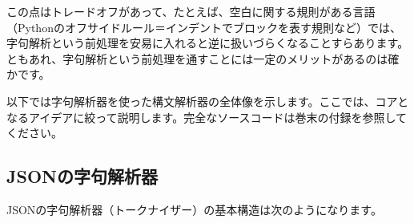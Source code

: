 この点はトレードオフがあって、たとえば、空白に関する規則がある言語（Pythonのオフサイドルール＝インデントでブロックを表す規則など）では、字句解析という前処理を安易に入れると逆に扱いづらくなることすらあります。ともあれ、字句解析という前処理を通すことには一定のメリットがあるのは確かです。

以下では字句解析器を使った構文解析器の全体像を示します。ここでは、コアとなるアイデアに絞って説明します。完全なソースコードは巻末の付録を参照してください。

\hypertarget{chapter3-jsonux306eux5b57ux53e5ux89e3ux6790ux5668}{%
\subsection{JSONの字句解析器}\label{chapter3-jsonux306eux5b57ux53e5ux89e3ux6790ux5668}}

JSONの字句解析器（トークナイザー）の基本構造は次のようになります。

